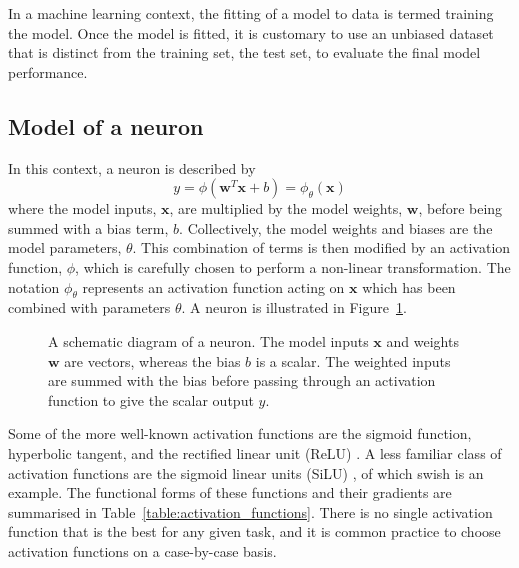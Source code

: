 \documentclass[main.tex]{subfiles}
\begin{document}
    In a machine learning context, the fitting of a
    model to data is termed training the model.
    Once the model is fitted, it is customary to use
    an unbiased dataset that is distinct from the training set, the test set,
    to evaluate the final model performance.

\subsection{Model of a neuron}
    In this context, a neuron is described by
    \begin{equation}\label{eqn:neuron}
        y = \phi(\mathbf{w}^{T}\mathbf{x} + b) = \phi_{\theta}(\mathbf{x})
    \end{equation}
    where the model inputs, $\mathbf{x}$, are multiplied
    by the model weights, $\mathbf{w}$, before being summed
    with a bias term, $b$. Collectively, the model weights
    and biases are the model parameters, $\theta$.
    This combination of terms is then modified
    by an activation function, $\phi$, which is carefully
    chosen to perform a non-linear transformation. The
    notation $\phi_{\theta}$ represents an activation function
    acting on $\mathbf{x}$ which has been combined with parameters $\theta$.
    A neuron is illustrated in Figure~\ref{fig:neuron}.
    
    \begin{figure}
        \caption{A schematic diagram of a neuron. The model inputs
        $\mathbf{x}$ and weights $\mathbf{w}$ are vectors, whereas
        the bias $b$ is a scalar. The weighted inputs are summed with
        the bias before passing through an activation function
        to give the scalar output $y$.}
        \label{fig:neuron}
    \end{figure}
    
    Some of the more well-known activation functions are
    the sigmoid function, hyperbolic tangent, and the rectified linear unit (ReLU) \cite{Nair2010RectifiedLU}.
    A less familiar class of activation functions are the
    sigmoid linear units (SiLU) \cite{Hendrycks2016BridgingNA},
    of which swish \cite{DBLP:journals/corr/abs-1710-05941} is an example.
    The functional forms of these
    functions and their gradients are summarised in Table~\ref{table:activation_functions}.
    There is no single activation function that is the best
    for any given task, and it is common practice to choose activation
    functions on a case-by-case basis.
\end{document}
